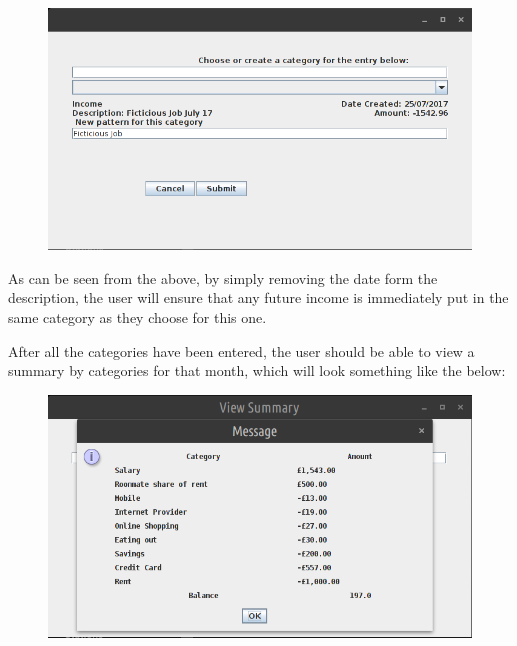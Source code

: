 \begin{figure}[ht!]
  \begin{center}
    \includegraphics[width=14cm]{./contents/img/fictitious_job.png}
  \end{center}
  \caption{}
\end{figure}
\FloatBarrier

As can be seen from the above, by simply removing the date form the
description, the user will ensure that any future income is immediately put in
the same category as they choose for this one.

After all the categories have been entered, the user should be able to view a
summary by categories for that month, which will look something like the below:

\begin{figure}[ht!]
  \begin{center}
    \includegraphics[width=14cm]{./contents/img/view_summary.png}
  \end{center}
  \caption{}
\end{figure}
\FloatBarrier


